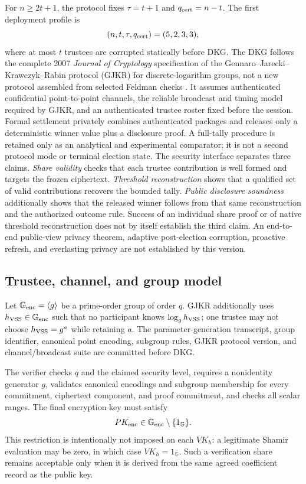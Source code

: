 \documentclass[pdflatex,sn-mathphys-num]{sn-jnl}%
\theoremstyle{thmstyleone}%
\theoremstyle{thmstyletwo}%
\theoremstyle{thmstylethree}%
\begin{document}
For $n\geq2t+1$, the protocol fixes $\tau=t+1$ and
$q_{\rm cert}=n-t$.  The first deployment profile is
\[
 (n,t,\tau,q_{\rm cert})=(5,2,3,3),
\]
where at most $t$ trustees are corrupted statically before DKG.  The DKG
follows the complete 2007 \emph{Journal of Cryptology} specification of the
Gennaro--Jarecki--Krawczyk--Rabin protocol (GJKR) for discrete-logarithm
groups, not a new protocol assembled from selected Feldman checks
\cite{bib133,bib134}.  It assumes authenticated confidential point-to-point channels,
the reliable broadcast and timing model required by GJKR, and an authenticated
trustee roster fixed before the session.  Formal settlement privately combines
authenticated packages and releases only a deterministic winner value plus a
disclosure proof.  A full-tally procedure is retained only as an analytical
and experimental comparator; it is not a second protocol mode or terminal
election state.
The security interface separates three claims.  \emph{Share validity} checks
that each trustee contribution is well formed and targets the frozen
ciphertext.  \emph{Threshold reconstruction} shows that a qualified set of
valid contributions recovers the bounded tally.  \emph{Public disclosure
soundness} additionally shows that the released winner follows from that same
reconstruction and the authorized outcome rule.  Success of an individual
share proof or of native threshold reconstruction does not by itself establish
the third claim.
An end-to-end public-view privacy theorem, adaptive post-election corruption, proactive
refresh, and everlasting privacy are not established by this version.

\subsection{Trustee, channel, and group model}
\label{subsec:threshold-model}

Let $\mathbb G_{\rm enc}=\langle g\rangle$ be a prime-order group of order
$q$.  GJKR additionally uses $h_{\rm VSS}\in\mathbb G_{\rm enc}$ such that no
participant knows $\log_g h_{\rm VSS}$; one trustee may not choose
$h_{\rm VSS}=g^a$ while retaining $a$.  The parameter-generation transcript,
group identifier, canonical point encoding, subgroup rules, GJKR protocol
version, and channel/broadcast suite are committed before DKG.

The verifier checks $q$ and the claimed security level, requires a nonidentity
generator $g$, validates canonical encodings and subgroup membership for every
commitment, ciphertext component, and proof commitment, and checks all scalar
ranges.  The final encryption key must satisfy
\[
 PK_{\rm enc}\in\mathbb G_{\rm enc}\setminus\{1_{\mathbb G}\}.
\]
This restriction is intentionally not imposed on each $VK_h$: a legitimate
Shamir evaluation may be zero, in which case $VK_h=1_{\mathbb G}$.  Such a
verification share remains acceptable only when it is derived from the same
agreed coefficient record as the public key.
\end{document}
